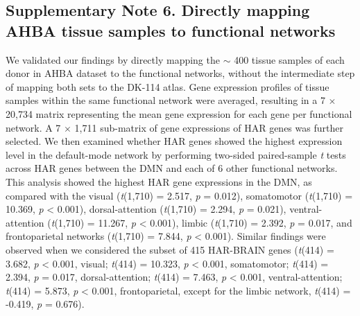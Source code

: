 \begin{refsection}
\subsection*{Supplementary Note 6. Directly mapping AHBA tissue samples to functional networks}
We validated our findings by directly mapping the $ \sim $ 400 tissue samples of each donor in AHBA dataset to the functional networks, without the intermediate step of mapping both sets to the DK-114 atlas. Gene expression profiles of tissue samples within the same functional network were averaged, resulting in a 7 $\times$ 20,734 matrix representing the mean gene expression for each gene per functional network. A 7 $\times$  1,711 sub-matrix of gene expressions of HAR genes was further selected. We then examined whether HAR genes showed the highest expression level in the default-mode network by performing two-sided paired-sample \textit{t} tests across HAR genes between the DMN and each of 6 other functional networks. This analysis showed the highest HAR gene expressions in the DMN, as compared with the visual (\textit{t}(1,710) = 2.517, \textit{p} = 0.012), somatomotor (\textit{t}(1,710) = 10.369, \textit{p} < 0.001), dorsal-attention (\textit{t}(1,710) = 2.294, \textit{p} = 0.021), ventral-attention (\textit{t}(1,710) = 11.267, \textit{p} < 0.001), limbic (\textit{t}(1,710) = 2.392, \textit{p} = 0.017, and frontoparietal networks (\textit{t}(1,710) = 7.844, \textit{p} < 0.001). Similar findings were observed when we considered the subset of 415 HAR-BRAIN genes (\textit{t}(414) = 3.682, \textit{p} < 0.001, visual; \textit{t}(414) = 10.323, \textit{p} < 0.001, somatomotor; \textit{t}(414) = 2.394, \textit{p} = 0.017, dorsal-attention; \textit{t}(414) = 7.463, \textit{p} < 0.001, ventral-attention; \textit{t}(414) = 5.873, \textit{p} < 0.001, frontoparietal, except for the limbic network, \textit{t}(414) = -0.419, \textit{p} = 0.676).


\end{refsection}
